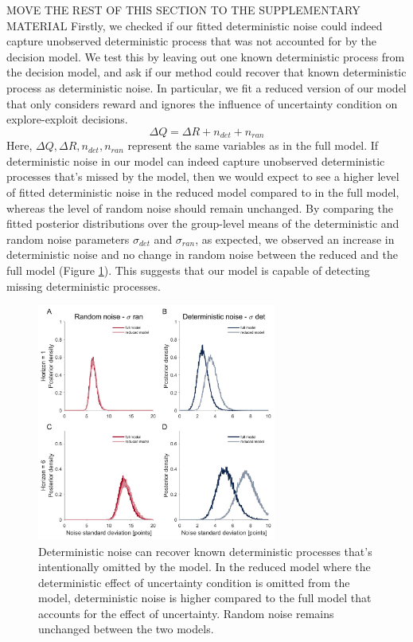 \documentclass[12pt]{article}
\begin{document}
	
	MOVE THE REST OF THIS SECTION TO THE SUPPLEMENTARY MATERIAL
	Firstly, we checked if our fitted deterministic noise could indeed capture unobserved deterministic process that was not accounted for by the decision model. We test this by leaving out one known deterministic process from the decision model, and ask if our method could recover that known deterministic process as deterministic noise. In particular, we fit a reduced version of our model that only considers reward and ignores the influence of uncertainty condition on explore-exploit decisions.  
	$$\Delta Q= \Delta R+n_{det}+n_{ran}$$
	Here, $\Delta Q, \Delta R, n_{det}, n_{ran}$ represent the same variables as in the full model.	If deterministic noise in our model can indeed capture unobserved deterministic processes that's missed by the model, then we would expect to see a higher level of fitted deterministic noise in the reduced model compared to in the full model, whereas the level of random noise should remain unchanged. By comparing the	fitted posterior distributions over the group-level means of the deterministic and random noise parameters $\sigma_{det}$ and $\sigma_{ran}$, as expected, we observed an increase in deterministic noise and no change in random noise between the reduced and the full model (Figure \ref{fig:reducedmodel}). This suggests that our model is capable of detecting missing deterministic processes.
	
	\begin{figure}[H]
		\begin{center}
			\includegraphics[width=0.7\textwidth]{figures/RDBayes_reduced_model.jpg}
			\caption{Deterministic noise can recover known deterministic processes that's intentionally omitted by the model. In the reduced model where the deterministic effect of uncertainty condition is omitted from the model, deterministic noise is higher compared to the full model that accounts for the effect of uncertainty. Random noise remains unchanged between the two models.}
			\label{fig:reducedmodel}
		\end{center}
	\end{figure} 
	
\end{document}
